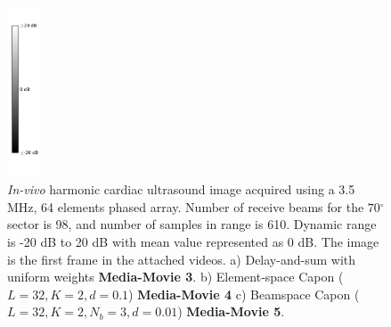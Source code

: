 \documentclass[journal]{IEEEtran}
\newcommand{\degree}{\ensuremath{^\circ}}
\newcommand\multimedia[1]{\textbf{{\color{red}#1}}}
\begin{document}
\begin{figure}[!t]
\centerline{
\hfil
{}
\hfil
{}
\hfil
\includegraphics[width=0.4in]{gfx/colorBarInvivo2.png}
}
\caption{\textit{In-vivo} harmonic cardiac ultrasound image acquired using a 3.5 MHz, 64 elements phased array. Number of receive beams for the $70\degree$ sector is 98, and number of samples in range is 610. Dynamic range is -20 dB to 20 dB with mean value represented as 0 dB. The image is the first frame in the attached videos. a) Delay-and-sum with uniform weights \multimedia{Media-Movie 3}. b) Element-space Capon ($L=32, K=2, d=0.1$) \multimedia{Media-Movie 4} c) Beamspace Capon ($L=32, K=2, N_b=3, d=0.01$) \multimedia{Media-Movie 5}.}
\label{fig:invivo}
\end{figure}
\end{document}
